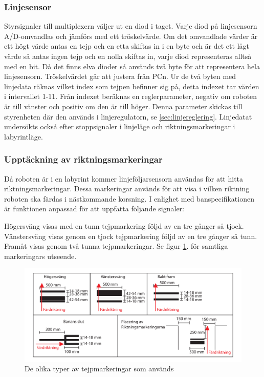 \subsubsection{Linjesensor}
\label{sec:linjesensor}
Styrsignaler till multiplexern väljer ut en diod i taget.
Varje diod på linjesensorn A/D-omvandlas och jämförs med ett tröskelvärde. Om
det omvandlade värder är
ett högt värde antas en tejp och en etta skiftas in i en byte och är det 
ett lågt värde så antas ingen tejp och en nolla skiftas in, varje diod
representeras alltså med en bit. Då det finns elva dioder så används två byte 
för att representera hela linjesensorn. Tröskelvärdet går att justera från PCn. 
Ur de två byten med linjedata räknas vilket index som tejpen befinner sig på,
detta indexet tar värden i intervallet 1-11. Från indexet beräknas en
reglerparameter, negativ om roboten är till vänster och positiv om den är till
höger. Denna parameter skickas till styrenheten där den används i
linjeregulatorn, se \ref{sec:linjereglering}. Linjedatat undersökts också efter
stoppsignaler i linjeläge och riktningsmarkeringar i labyrintläge.

\subsubsection{Upptäckning av riktningsmarkeringar}
\label{sec:riktmark}
Då roboten är i en labyrint kommer linjeföljarsensorn användas 
för att hitta riktningsmarkeringar. Dessa markeringar används för att visa i 
vilken riktning roboten ska färdas i nästkommande korsning.  I enlighet med 
banspecifikationen är funktionen anpassad för att uppfatta 
följande signaler:

Högersväng visas med en tunn tejpmarkering följd av en tre gånger så tjock.
Vänstersväng visas genom en tjock tejpmarkering följd av en tre gånger så tunn.
Framåt visas genom två tunna tejpmarkeringar. Se figur \ref{fig:tejpmarkeringar}.
för samtliga markeringars utseende.

\begin{figure}[H]
  \centering
 \includegraphics[angle=0,scale=0.5]{bilder/tejpmarkeringar.pdf}
  \caption{De olika typer av tejpmarkeringar som används}
  \label{fig:tejpmarkeringar}
\end{figure}


